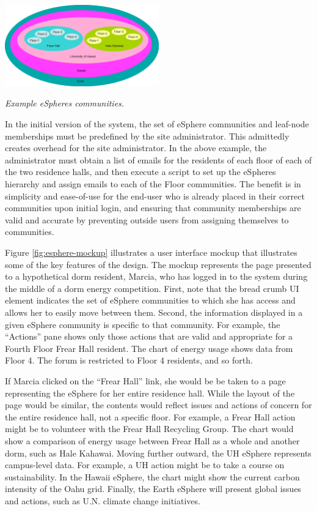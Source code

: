 \begin{floatingfigure}[l]{3.25in}
 \center
  \includegraphics[width=0.5\textwidth]{espheres.eps}
  \caption{\em \small Example eSpheres communities.}
 \label{fig:espheres}
\end{floatingfigure} 

In the initial version of the system, the set of eSphere communities and
leaf-node memberships must be predefined by the site administrator. This
admittedly creates overhead for the site administrator. In the above
example, the administrator must obtain a list of emails for the residents
of each floor of each of the two residence halls, and then execute a script
to set up the eSpheres hierarchy and assign emails to each of the Floor
communities. The benefit is in simplicity and ease-of-use for the end-user
who is already placed in their correct communities upon initial login, 
and ensuring that community memberships are valid and accurate by
preventing outside users from assigning themselves to communities.

Figure \ref{fig:esphere-mockup} illustrates a user interface mockup that
illustrates some of the key features of the design.  The mockup represents
the page presented to a hypothetical dorm resident, Marcia, who has logged
in to the system during the middle of a dorm energy competition.  First,
note that the bread crumb UI element indicates the set of eSphere
communities to which she has access and allows her to easily move between
them.  Second, the information displayed in a given eSphere community is
specific to that community.  For example, the ``Actions'' pane shows only
those actions that are valid and appropriate for a Fourth Floor Frear Hall
resident.  The chart of energy usage shows data from Floor 4.  The forum is
restricted to Floor 4 residents, and so forth.  

If Marcia clicked on the ``Frear Hall'' link, she would be be taken to a
page representing the eSphere for her entire residence hall.  While the
layout of the page would be similar, the contents would reflect issues and
actions of concern for the entire residence hall, not a specific floor. For
example, a Frear Hall action might be to volunteer with the Frear Hall
Recycling Group.   The chart would show a comparison of energy usage
between Frear Hall as a whole and another dorm, such as Hale Kahawai. 
Moving further outward, the UH eSphere represents campus-level data. For
example, a UH action might be to take a course on sustainability.  
In the Hawaii eSphere, the chart might show the current carbon intensity of
the Oahu grid.  Finally, the Earth eSphere will present global issues and
actions, such as U.N. climate change initiatives. 

